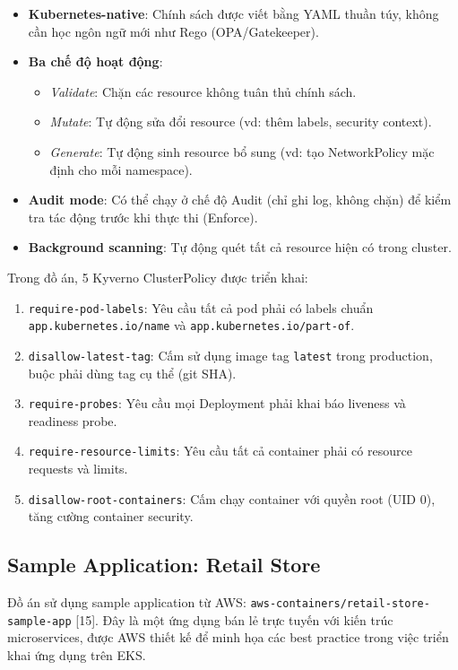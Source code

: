 \documentclass[13pt,a4paper,twoside]{extarticle}
\begin{document}
\begin{itemize}[leftmargin=*,nosep]
  \item \textbf{Kubernetes-native}: Chính sách được viết bằng YAML thuần túy, không cần học ngôn ngữ mới như Rego (OPA/Gatekeeper).
  \item \textbf{Ba chế độ hoạt động}:
  \begin{itemize}[nosep]
    \item \textit{Validate}: Chặn các resource không tuân thủ chính sách.
    \item \textit{Mutate}: Tự động sửa đổi resource (vd: thêm labels, security context).
    \item \textit{Generate}: Tự động sinh resource bổ sung (vd: tạo NetworkPolicy mặc định cho mỗi namespace).
  \end{itemize}
  \item \textbf{Audit mode}: Có thể chạy ở chế độ Audit (chỉ ghi log, không chặn) để kiểm tra tác động trước khi thực thi (Enforce).
  \item \textbf{Background scanning}: Tự động quét tất cả resource hiện có trong cluster.
\end{itemize}

Trong đồ án, 5 Kyverno ClusterPolicy được triển khai:
\begin{enumerate}[leftmargin=*,nosep]
  \item \texttt{require-pod-labels}: Yêu cầu tất cả pod phải có labels chuẩn \texttt{app.kubernetes.io/name} và \texttt{app.kubernetes.io/part-of}.
  \item \texttt{disallow-latest-tag}: Cấm sử dụng image tag \texttt{latest} trong production, buộc phải dùng tag cụ thể (git SHA).
  \item \texttt{require-probes}: Yêu cầu mọi Deployment phải khai báo liveness và readiness probe.
  \item \texttt{require-resource-limits}: Yêu cầu tất cả container phải có resource requests và limits.
  \item \texttt{disallow-root-containers}: Cấm chạy container với quyền root (UID 0), tăng cường container security.
\end{enumerate}

\subsection{Sample Application: Retail Store}

Đồ án sử dụng sample application từ AWS: \texttt{aws-containers/retail-store-sample-app} [15]. Đây là một ứng dụng bán lẻ trực tuyến với kiến trúc microservices, được AWS thiết kế để minh họa các best practice trong việc triển khai ứng dụng trên EKS.
\end{document}
